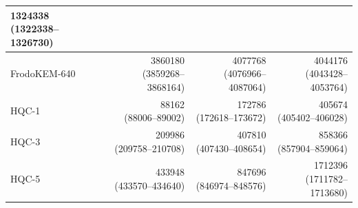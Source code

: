 \begin{table}[h]
\begin{tabular}{llrrr}
\makecell[r]{1324338\\(1322338--1326730)} \\
\midrule
FrodoKEM-640 & \cite{frodoKEM-github} &
\makecell[r]{3860180\\(3859268--3868164)} &
\makecell[r]{4077768\\(4076966--4087064)} &
\makecell[r]{4044176\\(4043428--4053764)} \\
\midrule
HQC-1 & \cite{hqc-github} &
\makecell[r]{88162\\(88006--89002)} &
\makecell[r]{172786\\(172618--173672)} &
\makecell[r]{405674\\(405402--406028)} \\
HQC-3 & \cite{hqc-github} &
\makecell[r]{209986\\(209758--210708)} &
\makecell[r]{407810\\(407430--408654)} &
\makecell[r]{858366\\(857904--859064)} \\
HQC-5 & \cite{hqc-github} &
\makecell[r]{433948\\(433570--434640)} &
\makecell[r]{847696\\(846974--848576)} &
\makecell[r]{1712396\\(1711782--1713680)} \\
\bottomrule
\end{tabular}
\end{table}


